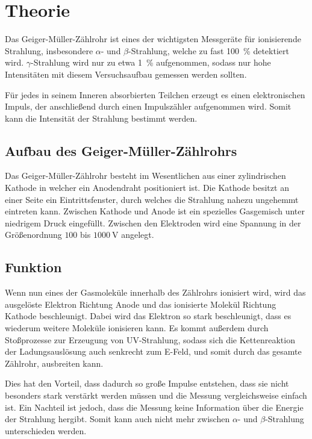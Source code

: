 \section{Theorie}
\label{sec:Theorie}
Das Geiger-Müller-Zählrohr ist eines der wichtigsten Messgeräte für ionisierende Strahlung, 
insbesondere $\alpha$- und $\beta$-Strahlung, welche zu fast \SI{100}{\percent} detektiert wird.
$\gamma$-Strahlung wird nur zu etwa \SI{1}{\percent} aufgenommen, 
sodass nur hohe Intensitäten mit diesem Versuchsaufbau gemessen werden sollten.

Für jedes in seinem Inneren absorbierten Teilchen erzeugt es einen elektronischen Impuls, 
der anschließend durch einen Impulszähler aufgenommen wird.
Somit kann die Intensität der Strahlung bestimmt werden.

\subsection{Aufbau des Geiger-Müller-Zählrohrs}
Das Geiger-Müller-Zählrohr besteht im Wesentlichen aus einer zylindrischen Kathode in welcher ein Anodendraht positioniert ist.
Die Kathode besitzt an einer Seite ein Eintrittsfenster, durch welches die Strahlung nahezu ungehemmt eintreten kann.
Zwischen Kathode und Anode ist ein spezielles Gasgemisch unter niedrigem Druck eingefüllt.
Zwischen den Elektroden wird eine Spannung in der Größenordnung $\num{100}$ bis $\SI{1000}{\volt}$ angelegt.

\subsection{Funktion}
Wenn nun eines der Gasmoleküle innerhalb des Zählrohrs ionisiert wird, wird das ausgelöste Elektron Richtung Anode und das ionisierte Molekül
Richtung Kathode beschleunigt. Dabei wird das Elektron so stark beschleunigt, dass es wiederum weitere Moleküle ionisieren kann.
Es kommt außerdem durch Stoßprozesse zur Erzeugung von UV-Strahlung, sodass sich die Kettenreaktion der Ladungsauslösung 
auch senkrecht zum E-Feld, und somit durch das gesamte Zählrohr, ausbreiten kann.

Dies hat den Vorteil, dass dadurch so große Impulse entstehen, dass sie nicht besonders stark verstärkt werden müssen und die 
Messung vergleichsweise einfach ist. Ein Nachteil ist jedoch, dass die Messung keine Information 
über die Energie der Strahlung hergibt. Somit kann auch nicht mehr zwischen $\alpha$- und $\beta$-Strahlung unterschieden werden.

